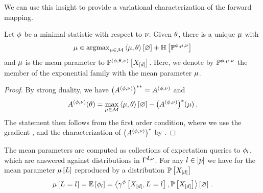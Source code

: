 We can use this insight to provide a variational characterization of the forward mapping.

\begin{theorem}
    Let $\phi$ be a minimal statistic with respect to $\nu$.
    Given $\theta$, there is a unique $\mu$ with
    \begin{align*}
         \meanparam \in \argmax_{\meanparam\in\meanset} \contraction{\meanparam,\canparam} + \sentropyof{\expdistof{\sstat,\meanparam,\basemeasure}} %
    \end{align*}
    and $\mu$ is the mean parameter to $\mathbb{P}^{(\phi,\theta,\nu)}\left[X_{[d]}\right]$.
    Here, we denote by $\mathbb{P}^{\phi,\mu,\nu}$ the member of the exponential family with the mean parameter $\mu$.
\end{theorem}
\begin{proof}
    By strong duality, we have $\left(A^{(\phi,\nu)}\right)^{**}=A^{(\phi,\nu)}$ and
    \begin{align*}
        A^{(\phi,\nu)}(\theta) = \max_{\mu\in\mathcal{M}} \left\langle \mu,\theta\right\rangle \left[ \varnothing \right] -  \big(A^{(\phi,\nu)}\big)^*(\mu) \, .
    \end{align*}
    The statement then follows from the first order condition, where we use the gradient , and the characterization of $\big(A^{(\phi,\nu)}\big)^*$ by . %
\end{proof}





The mean parameters are computed as collections of expectation queries to $\phi_{l}$, which are answered against distributions in $\Gamma^{\delta,\nu}$.
For any $l\in[p]$ we have for the mean parameter $\mu\left[L\right]$ reproduced by a distribution $\mathbb{P}\left[X_{[d]}\right]$
\begin{align*}
    \mu\left[L_{}=l_{}\right]
    = \mathbb{E}\left[\phi_{l}\right]
    = \left\langle \gamma^{\phi}\left[X_{[d]},L_{}=l_{}\right],\mathbb{P}\left[X_{[d]}\right]\right\rangle \left[ \varnothing \right] \, .
\end{align*}


